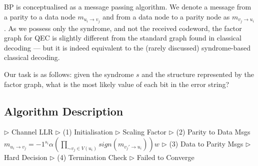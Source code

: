 BP is conceptualised as a message passing algorithm. We denote a message from a parity to a data node $m_{u_i \rightarrow v_j}$ and from a data node to a parity node as $m_{v_j \rightarrow u_i}$. As we possess only the syndrome, and not the received codeword, the factor graph for QEC is slightly different from the standard graph found in classical decoding --- but it is indeed equivalent to the (rarely discussed) syndrome-based classical decoding.

Our task is as follows: given the syndrome $s$ and the structure represented by the factor graph, what is the most likely value of each bit in the error string?

\subsection*{Algorithm Description}
\begin{algorithm}[H]
\begin{algorithmic}[1]
\Statex
{}  
\Statex
\State $\triangleright$ Channel LLR
\Statex
\State $\triangleright$ (1) Initialisation
\EndFor
\Statex
{}
\Statex
\State $\triangleright$ Scaling Factor
\Statex
\State $\triangleright$ (2) Parity to Data Msgs
\State $m_{u_i \rightarrow v_j} = -1^{s_i} \alpha ( \prod_{\sim v_j \in V(u_i) } sign ( m_{v_j' \rightarrow u_i}) ) w$
\EndFor   
\Statex
\State $\triangleright$ (3) Data to Parity Msgs 
\EndFor
\Statex
\State $\triangleright$ Hard Decision
\EndFor  			   		
\Statex
\State $\triangleright$ (4) Termination Check    						
\State {}
\EndIf
\EndFor
\Statex
\State $\triangleright$ Failed to Converge
\State {} 
\EndFunction
\end{algorithmic}
\caption{Pseudocode for Belief Propagation using log likelihood ratios, the minsum product algorithm, and a scaling factor. Log likelihood ratios and the minsum algorithm (the use of $w$ in Line 13) make the computation more efficient and avoid the numerical instability of other implementations.}
\label{alg:bp}
\end{algorithm}

